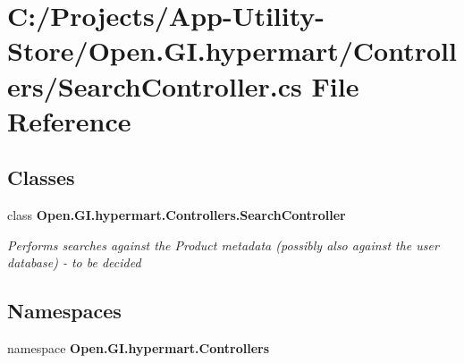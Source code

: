 \section{C\+:/\+Projects/\+App-\/\+Utility-\/\+Store/\+Open.G\+I.\+hypermart/\+Controllers/\+Search\+Controller.cs File Reference}
\label{_search_controller_8cs}
\subsection*{Classes}
\begin{DoxyCompactItemize}
\item 
class \textbf{ Open.\+G\+I.\+hypermart.\+Controllers.\+Search\+Controller}
\begin{DoxyCompactList}\small\item\em Performs searches against the Product metadata (possibly also against the user database) -\/ to be decided \end{DoxyCompactList}\end{DoxyCompactItemize}
\subsection*{Namespaces}
\begin{DoxyCompactItemize}
\item 
namespace \textbf{ Open.\+G\+I.\+hypermart.\+Controllers}
\end{DoxyCompactItemize}
